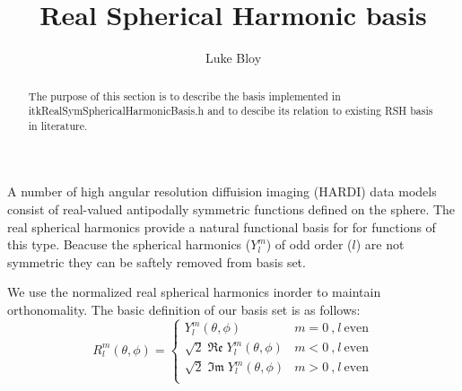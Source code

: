 \documentclass[a4paper,10pt]{article}
\title{Real Spherical Harmonic basis}
\author{Luke Bloy}
\renewcommand\Re{\operatorname{\mathfrak{Re}}}
\renewcommand\Im{\operatorname{\mathfrak{Im}}}
\begin{document}
\maketitle

\begin{abstract}
The purpose of this section is to describe the basis implemented in itkRealSymSphericalHarmonicBasis.h and to descibe its relation to existing RSH basis in literature.
\end{abstract}

A number of high angular resolution diffuision imaging (HARDI) data models consist of real-valued antipodally symmetric functions defined on the sphere. The real spherical harmonics provide a natural functional basis for for functions of this type. Beacuse the spherical harmonics ($Y_l^m$) of odd order ($l$) are not symmetric they can be saftely removed from basis set.

We use the normalized real spherical harmonics inorder to maintain orthonomality. The basic definition of our basis set is as follows:
\begin{equation}
\label{eq:RSHdef}
R_l^m(\theta,\phi) = \begin{cases}
         Y_l^m(\theta,\phi)               & m = 0 \: \text{,} \: l \: \text{even}\\
	\sqrt{2} \Re{Y_l^m(\theta,\phi)}  & m < 0 \: \text{,} \: l \: \text{even}\\
        \sqrt{2} \Im{Y_l^m(\theta,\phi)}  & m > 0 \: \text{,} \: l \: \text{even}\\        
\end{cases}
\end{equation}
\end{document}

